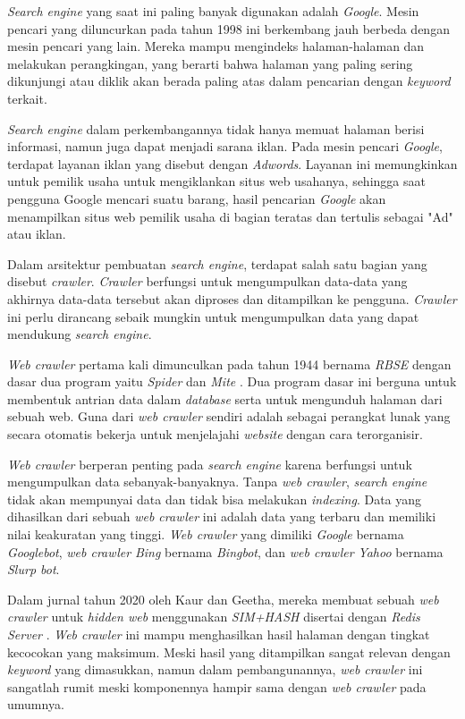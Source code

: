 \textit{Search engine} yang saat ini paling banyak digunakan adalah \textit{Google}. Mesin pencari yang diluncurkan pada tahun 1998 ini berkembang jauh berbeda dengan mesin pencari yang lain. Mereka mampu mengindeks halaman-halaman dan melakukan perangkingan, yang berarti bahwa halaman yang paling sering dikunjungi atau diklik akan berada paling atas dalam pencarian dengan \textit{keyword} terkait.

\textit{Search engine} dalam perkembangannya tidak hanya memuat halaman berisi informasi, namun juga dapat menjadi sarana iklan. Pada mesin pencari \textit{Google}, terdapat layanan iklan yang disebut dengan \textit{Adwords}. Layanan ini memungkinkan untuk pemilik usaha untuk mengiklankan situs web usahanya, sehingga saat pengguna Google mencari suatu barang, hasil pencarian \textit{Google} akan menampilkan situs web pemilik usaha di bagian teratas dan tertulis sebagai "Ad" atau iklan.

Dalam arsitektur pembuatan \textit{search engine}, terdapat salah satu bagian yang disebut \textit{crawler}. \textit{Crawler} berfungsi untuk mengumpulkan data-data yang akhirnya data-data tersebut akan diproses dan ditampilkan ke pengguna. \textit{Crawler} ini perlu dirancang sebaik mungkin untuk mengumpulkan data yang dapat mendukung \textit{search engine}.

\textit{Web crawler} pertama kali dimunculkan pada tahun 1944 bernama \textit{RBSE} dengan dasar dua program yaitu \textit{Spider} dan \textit{Mite} \citep{eichmann1994the}. Dua program dasar ini berguna untuk membentuk antrian data dalam \textit{database} serta untuk mengunduh halaman dari sebuah web. Guna dari \textit{web crawler} sendiri adalah sebagai perangkat lunak yang secara otomatis bekerja untuk menjelajahi \textit{website} dengan cara terorganisir.

\textit{Web crawler} berperan penting pada \textit{search engine} karena berfungsi untuk mengumpulkan data sebanyak-banyaknya. Tanpa \textit{web crawler}, \textit{search engine} tidak akan mempunyai data dan tidak bisa melakukan \textit{indexing}. Data yang dihasilkan dari sebuah \textit{web crawler} ini adalah data yang terbaru dan memiliki nilai keakuratan yang tinggi. \textit{Web crawler} yang dimiliki \textit{Google} bernama \textit{Googlebot}, \textit{web crawler} \textit{Bing} bernama \textit{Bingbot}, dan \textit{web crawler} \textit{Yahoo} bernama \textit{Slurp bot}.

Dalam jurnal tahun 2020 oleh Kaur dan Geetha, mereka membuat sebuah \textit{web crawler} untuk \textit{hidden web} menggunakan \textit{SIM+HASH} disertai dengan \textit{Redis Server} \citep{kaur2020simhar}. \textit{Web crawler} ini mampu menghasilkan hasil halaman dengan tingkat kecocokan yang maksimum. Meski hasil yang ditampilkan sangat relevan dengan \textit{keyword} yang dimasukkan, namun dalam pembangunannya, \textit{web crawler} ini sangatlah rumit meski komponennya hampir sama dengan \textit{web crawler} pada umumnya.

